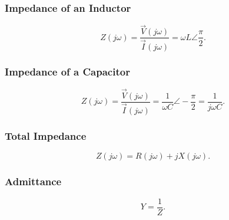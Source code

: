 \begin{symbols}
\end{symbols}

\subsubsection{Impedance of an Inductor}
\begin{equation*}
  Z(j \omega) = \frac{\Vec{V} (j \omega)}{\Vec{I} (j\omega)} = \omega L \angle \frac{\pi}{2}
.\end{equation*}

\begin{symbols}
\end{symbols}

\subsubsection{Impedance of a Capacitor}
\begin{equation*}
  Z(j\omega) = \frac{\Vec{V}(j\omega)}{\Vec{I}(j\omega)} = \frac{1}{\omega C} \angle - \frac{\pi}{2} = \frac{1}{j \omega C}
.\end{equation*}

\begin{symbols}
\end{symbols}

\subsubsection{Total Impedance}
\begin{equation*}
  Z(j\omega) = R(j\omega) + j X (j \omega)
.\end{equation*}

\begin{symbols}
\end{symbols}

\subsubsection{Admittance}
\begin{equation*}
  Y = \frac{1}{Z}
.\end{equation*}

